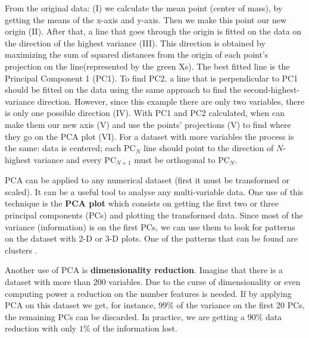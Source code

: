 From the original data: (I) we calculate the mean point (center of mass), by getting the means of the x-axis and y-axis. Then we make this point our new origin (II). After that, a line that goes through the origin is fitted on the data on the direction of the highest variance (III). This direction is obtained by maximizing the sum of squared distances from the origin of each point's projection on the line(represented by the green Xs). The best fitted line is the Principal Component 1 (PC1). To find PC2, a line that is perpendicular to PC1 should be fitted on the data using the same approach to find the second-highest-variance direction. However, since this example there are only two variables, there is only one possible direction (IV). With PC1 and PC2 calculated, when can make them our new axis (V) and use the points' projections (V) to find where they go on the PCA plot (VI). For a dataset with more variables the process is the same: data is centered; each PC$_{N}$ line should point to the direction of $N$-highest variance and every PC$_{N+1}$ must be orthogonal to PC$_{N}$.

PCA can be applied to any numerical dataset \cite{wold1987principal} (first it must be transformed or scaled). It can be a useful tool to analyse any multi-variable data. One use of this technique is the \textbf{PCA plot} which consists on getting the first two or three principal components (PCs) and plotting the transformed data. Since most of the variance (information) is on the first PCs, we can use them to look for patterns on the dataset with 2-D or 3-D plots. One of the patterns that can be found are clusters \cite{ding2004k}. 

Another use of PCA is \textbf{dimensionality reduction}. Imagine that there is a dataset with more than 200 variables. Due to the curse of dimensionality \cite{Bellman:2010:DP:1893145} or even computing power a reduction on the number features is needed. If by applying PCA on this dataset we get, for instance, $99\%$ of the variance on the first 20 PCs, the remaining PCs can be discarded. In practice, we are getting a $90\%$ data reduction with only $1\%$ of the information lost.





